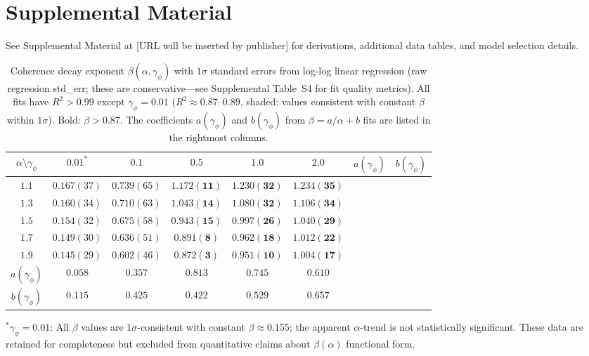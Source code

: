 \documentclass[aps,prd,twocolumn,superscriptaddress,floatfix]{revtex4-2}
\begin{document}
\section*{Supplemental Material}

See Supplemental Material at [URL will be inserted by publisher] for
derivations, additional data tables, and model selection details.


\begin{table}[t]
\caption{Coherence decay exponent $\beta(\alpha,\gamma_\phi)$ with
$1\sigma$ standard errors from log-log linear regression (raw
regression std\_err; these are conservative---see Supplemental
Table~S4 for fit quality metrics). All fits have $R^2 > 0.99$ except
$\gamma_\phi = 0.01$ ($R^2 \approx 0.87$--$0.89$, shaded: values
consistent with constant $\beta$ within $1\sigma$). Bold:
$\beta > 0.87$. The coefficients $a(\gamma_\phi)$ and $b(\gamma_\phi)$
from $\beta = a/\alpha + b$ fits are listed in the rightmost columns.}
\label{tab:beta_baseline}
\begin{ruledtabular}
\begin{tabular}{c|ccccc|cc}
$\alpha \setminus \gamma_\phi$ & $0.01^\ast$ & $0.1$ & $0.5$ & $1.0$ & $2.0$ &
$a(\gamma_\phi)$ & $b(\gamma_\phi)$ \\
\hline
$1.1$ & $0.167(37)$ & $0.739(65)$ & $\mathbf{1.172(11)}$ & $\mathbf{1.230(32)}$ & $\mathbf{1.234(35)}$ & & \\
$1.3$ & $0.160(34)$ & $0.710(63)$ & $\mathbf{1.043(14)}$ & $\mathbf{1.080(32)}$ & $\mathbf{1.106(34)}$ & & \\
$1.5$ & $0.154(32)$ & $0.675(58)$ & $\mathbf{0.943(15)}$ & $\mathbf{0.997(26)}$ & $\mathbf{1.040(29)}$ & & \\
$1.7$ & $0.149(30)$ & $0.636(51)$ & $\mathbf{0.891(8)}$  & $\mathbf{0.962(18)}$ & $\mathbf{1.012(22)}$ & & \\
$1.9$ & $0.145(29)$ & $0.602(46)$ & $\mathbf{0.872(3)}$  & $\mathbf{0.951(10)}$ & $\mathbf{1.004(17)}$ & & \\
\hline
$a(\gamma_\phi)$ & $0.058$ & $0.357$ & $0.813$ & $0.745$ & $0.610$ & & \\
$b(\gamma_\phi)$ & $0.115$ & $0.425$ & $0.422$ & $0.529$ & $0.657$ & & \\
\end{tabular}
\end{ruledtabular}

\vspace{4pt}
\noindent$^\ast\gamma_\phi = 0.01$: All $\beta$ values are
$1\sigma$-consistent with constant $\beta \approx 0.155$; the apparent
$\alpha$-trend is not statistically significant. These data are
retained for completeness but excluded from quantitative claims about
$\beta(\alpha)$ functional form.
\end{table}
\end{document}

